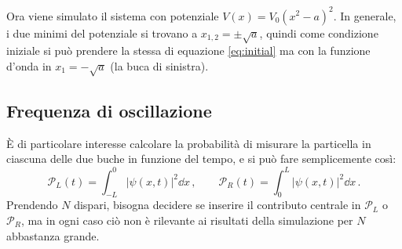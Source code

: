 \documentclass[a4paper, titlepage]{article}
\numberwithin{equation}{section}
\begin{document}
Ora viene simulato il sistema con potenziale $V(x) = V_0(x^2-a)^2$. In generale, i due minimi del potenziale si trovano a $x_{1,2} = \pm \sqrt{a}$, quindi come condizione iniziale si può prendere la stessa di equazione \eqref{eq:initial} ma con la funzione d'onda in $x_1 = -\sqrt{a}$ (la buca di sinistra). 

\subsection{Frequenza di oscillazione}

È di particolare interesse calcolare la probabilità di misurare la particella in ciascuna delle due buche in funzione del tempo, e si può fare semplicemente così:
\[
    \mathcal{P}_L(t) = \int_{-L}^0 |\psi(x,t)|^2 \dd x\, ,
    \qquad
    \mathcal{P}_R(t) = \int_0^L |\psi(x,t)|^2 \dd x\, .
\]
Prendendo $N$ dispari, bisogna decidere se inserire il contributo centrale in $\mathcal{P}_L$ o  $\mathcal{P}_R$, ma in ogni caso ciò non è rilevante ai risultati della simulazione per $N$ abbastanza grande. 
\end{document}
